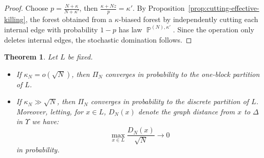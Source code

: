 \documentclass[11pt]{article}
\DeclareMathOperator{\PP}{\mathbb{P}}
\newtheorem{theorem}{Theorem}[section]
\newtheorem{remark}{Remark}[section]
\begin{document}
\begin{proof}
Choose
$
p=\frac{N+\kappa}{N+\kappa'}$, then 
$\frac{\kappa+Nz}{p}=\kappa'$.
By Proposition~\ref{prop:cutting-effective-killing}, the forest obtained from
a \(\kappa\)-biased forest by independently cutting each internal edge with
probability \(1-p\) has law \(\PP^{(N),\kappa'}\). Since the operation only
deletes internal edges, the stochastic domination follows.
\end{proof}
%

\begin{theorem}\label{thm:trivial-regimes}
Let \(L\) be fixed.
\begin{itemize}
\item[(a)] If \(\kappa_N=o(\sqrt N)\), then \(\Pi_N\) converges in probability
to the one-block partition of \(L\).
\item[(b)] If \(\kappa_N\gg\sqrt N\), then \(\Pi_N\) converges in probability
to the discrete partition of \(L\). Moreover, letting, for \(x\in L\), \(D_N(x)\) denote the graph distance from \(x\)
to \(\Delta\) in \(\Upsilon\) we have:
\[
\max_{x\in L}\frac{D_N(x)}{\sqrt N}\longrightarrow 0
\]
in probability.
\end{itemize}
\end{theorem}
\end{document}
